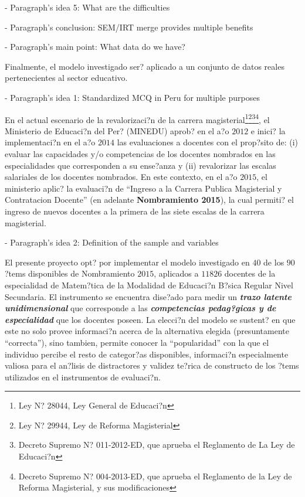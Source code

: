 - Paragraph's idea 5: What are the difficulties


- Paragraph's conclusion: SEM/IRT merge provides multiple benefits




- Paragraph's main point: What data do we have?

Finalmente, el modelo investigado ser? aplicado a un conjunto de datos reales pertenecientes al sector educativo. 

- Paragraph's idea 1: Standardized MCQ in Peru for multiple purposes

En el actual escenario de la revalorizaci?n de la carrera magisterial\footnote{Ley N? 28044, Ley General de Educaci?n}\footnote{Ley N? 29944, Ley de Reforma Magisterial}\footnote{Decreto Supremo N? 011-2012-ED, que aprueba el Reglamento de La Ley de Educaci?n}\footnote{Decreto Supremo N? 004-2013-ED, que aprueba el Reglamento de la Ley de Reforma Magisterial, y sus modificaciones}, el Ministerio de Educaci?n del Per? (MINEDU) aprob? en el a?o $2012$ e inici? la implementaci?n en el a?o $2014$ las evaluaciones a docentes con el prop?sito de: (i) evaluar las capacidades y/o competencias de los docentes nombrados en las especialidades que corresponden a su ense?anza y (ii) revalorizar las escalas salariales de los docentes nombrados. En este contexto, en el a?o $2015$, el ministerio aplic? la evaluaci?n de ``Ingreso a la Carrera Publica Magisterial y Contratacion Docente'' (en adelante \textbf{Nombramiento 2015}), la cual permiti? el ingreso de nuevos docentes a la primera de las siete escalas de la carrera magisterial.


- Paragraph's idea 2: Definition of the sample and variables

El presente proyecto opt? por implementar el modelo investigado en $40$ de los $90$ ?tems disponibles de Nombramiento $2015$, aplicados a $11826$ docentes de la especialidad de Matem?tica de la Modalidad de Educaci?n B?sica Regular Nivel Secundaria. El instrumento se encuentra dise?ado para medir un \textbf{\textit{trazo latente unidimensional}} que corresponde a las \textbf{\textit{competencias pedag?gicas y de especialidad}} que los docentes poseen. La elecci?n del modelo se sustent? en que este no solo provee informaci?n acerca de la alternativa elegida (presuntamente ``correcta''), sino tambien, permite conocer la ``popularidad'' con la que el individuo percibe el resto de categor?as disponibles, informaci?n especialmente valiosa para el an?lisis de distractores y validez te?rica de constructo de los ?tems utilizados en el instrumentos de evaluaci?n.

